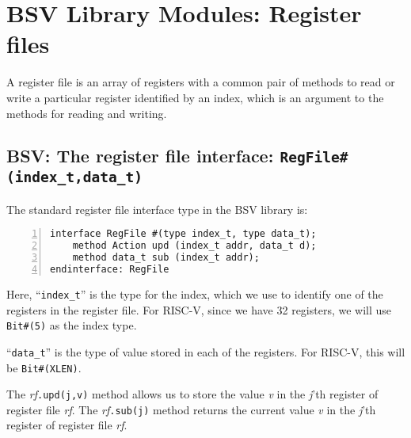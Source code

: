 
\section{BSV Library Modules: Register files}


A register file is an array of registers with a common pair of methods
to read or write a particular register identified by an index, which
is an argument to the methods for reading and writing.


\subsection{BSV: The register file interface: {\tt RegFile\#(index\_t,data\_t)}}

\label{Sec_RegFile_interface}



The standard register file interface type in the BSV library is:

{\small
\begin{Verbatim}[frame=single, numbers=left]
interface RegFile #(type index_t, type data_t);
    method Action upd (index_t addr, data_t d);
    method data_t sub (index_t addr);
endinterface: RegFile
\end{Verbatim}
}

Here, ``\verb|index_t|'' is the type for the index, which we use to
identify one of the registers in the register file.  For RISC-V, since
we have 32 registers, we will use \verb|Bit#(5)| as the index type.

``\verb|data_t|'' is the type of value stored in each of the
registers.  For RISC-V, this will be \verb|Bit#(XLEN)|.

The \emph{rf}{\tt.upd(j,v)} method allows us to store the value
\emph{v} in the \emph{j}'th register of register file \emph{rf}.  The
\emph{rf}{\tt.sub(j)} method returns the current value \emph{v} in the
\emph{j}'th register of register file \emph{rf}.

